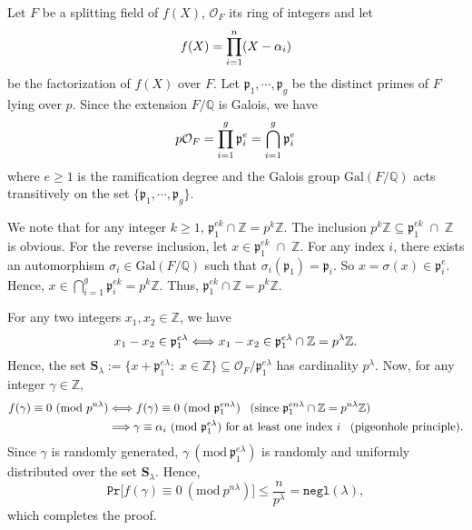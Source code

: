 \documentclass[11pt, lettersize, notitlepage, leqno, footskip=0.6cm]{article}
\newcommand{\bz}{\mathbb Z}
\newcommand{\bq}{\mathbb Q}
\newcommand{\pl}{\prod\limits}
\newcommand{\ttt}{\texttt}
\newcommand{\Gal}{\mathrm{Gal}}
\newcommand{\negl}{\ttt{{negl}}}
\newcommand{\LRA}{\Longleftrightarrow}
\newcommand{\mc}{\mathcal}
\newcommand{\mbf}{\mathbf}
\newcommand{\mfp}{\mathfrak{p}}
\newcommand{\al}{\alpha}
\newcommand{\lam}{\lambda}
\newcommand{\sub}{\subseteq}
\newcommand{\vs}{\vspace{-0.15cm}}
\newcommand{\Mod}[1]{\ (\mathrm{mod}\ #1)}
\numberwithin{equation}{section}
\begin{document}
\begin{prf} Let $F$ be a splitting field of $f(X)$, $\mc{O}_F$ its ring of integers and let \vspace{-0.2cm} $${f}(X) = \pl_{i=1}^n (X-\al_i) \vs $$ be the factorization of ${f}(X)$ over $F$. Let $\mfp_{1},\cdots,\mfp_g$ be the distinct primes of $F$ lying over $p$. Since the extension $F/\bq$ is Galois, we have \vspace{-0.3cm} $$p\mc{O}_F = \pl_{i=1}^{g} \mfp_i^e = \bigcap\limits_{i=1}^{g} \mfp_i^e \vs $$ where $e\geq 1$ is the ramification degree and the Galois group $\Gal(F/\bq)$ acts transitively on the set $\{ \mfp_1,\cdots,\mfp_g\}$.

We note that for any integer $k\geq 1$, $\mfp_1^{ek}\cap \bz = p^{k}\bz$. The inclusion $p^{k}\bz\sub \mfp_1^{ek}\;\cap \;\bz$ is obvious. For the reverse inclusion, let $x\in \mfp_1^{ek}\;\cap\; \bz$. For any index $i$, there exists an automorphism $\sigma_i\in \Gal(F/\bq)$ such that $\sigma_i(\mfp_1) = \mfp_i$. So $x = \sigma(x) \in \mfp_i^e$. Hence, $x\in \bigcap_{i=1}^g \mfp_i^{ek} = p^{k}\bz$. Thus, $\mfp_1^{ek}\cap \bz = p^{k}\bz$.

For any two integers $x_1,x_2\in \bz$, we have \vspace{-0.2cm} $$x_1-x_2\in \mfp_1^{e\lam}\LRA x_1-x_2\in \mfp_1^{e\lam}\cap \bz = p^{\lam}\bz. \vs $$ Hence, the set $ \mbf{S}_{\lam}:= \{x + {\mfp_1^{e\lam}}:\;x\in\bz \}\sub \mc{O}_F/\mfp_1^{e\lam} $ has cardinality $p^{\lam}$. Now, for any integer $\gamma\in \bz$, \vspace{-0.45cm} \begin{align*} \begin{split} f(\gamma)\equiv 0 \Mod{p^{n\lam}} & \LRA f(\gamma)\equiv 0 \Mod{\mfp_1^{en\lam}} \;\;\;(\text{since } \mfp_1^{en\lam}\cap\bz = p^{n\lam}\bz) \\ &\Longrightarrow \gamma\equiv \al_i \Mod{\mfp_1^{e\lam}}\text{ for at least one index } i\;\;\;\hfill (\text{pigeonhole principle}).\end{split} \end{align*} Since $\gamma$ is randomly generated, $\gamma\Mod{\mfp_1^{e\lam}}$ is randomly and uniformly distributed over the set $\mbf{S}_{\lam}$. Hence, \vs $$ \ttt{Pr}\big[ f(\gamma)\equiv 0 \Mod{p^{n\lam}} \big]\leq \frac{n}{p^{\lam}} = \negl(\lam),$$ which completes the proof.\end{prf}
\end{document}
